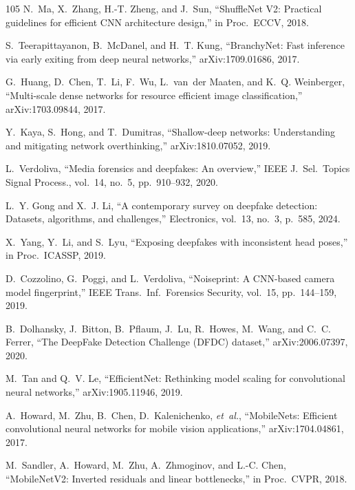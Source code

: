 \begin{thebibliography}{105}
N.~Ma, X.~Zhang, H.-T. Zheng, and J.~Sun, ``ShuffleNet V2: Practical guidelines for efficient CNN architecture design,'' in Proc.\ ECCV, 2018.

S.~Teerapittayanon, B.~McDanel, and H.~T. Kung, ``BranchyNet: Fast inference via early exiting from deep neural networks,'' arXiv:1709.01686, 2017.

G.~Huang, D.~Chen, T.~Li, F.~Wu, L.~van~der Maaten, and K.~Q. Weinberger, ``Multi-scale dense networks for resource efficient image classification,'' arXiv:1703.09844, 2017.

Y.~Kaya, S.~Hong, and T.~Dumitras, ``Shallow-deep networks: Understanding and mitigating network overthinking,'' arXiv:1810.07052, 2019.

L.~Verdoliva, ``Media forensics and deepfakes: An overview,'' IEEE J.\ Sel.\ Topics Signal Process., vol.~14, no.~5, pp.~910--932, 2020.

L.~Y. Gong and X.~J. Li, ``A contemporary survey on deepfake detection: Datasets, algorithms, and challenges,'' Electronics, vol.~13, no.~3, p.~585, 2024.

X.~Yang, Y.~Li, and S.~Lyu, ``Exposing deepfakes with inconsistent head poses,'' in Proc.\ ICASSP, 2019.

D.~Cozzolino, G.~Poggi, and L.~Verdoliva, ``Noiseprint: A CNN-based camera model fingerprint,'' IEEE Trans.\ Inf.\ Forensics Security, vol.~15, pp.~144--159, 2019.

B.~Dolhansky, J.~Bitton, B.~Pflaum, J.~Lu, R.~Howes, M.~Wang, and C.~C. Ferrer, ``The DeepFake Detection Challenge (DFDC) dataset,'' arXiv:2006.07397, 2020.

M.~Tan and Q.~V. Le, ``EfficientNet: Rethinking model scaling for convolutional neural networks,'' arXiv:1905.11946, 2019.

A.~Howard, M.~Zhu, B.~Chen, D.~Kalenichenko, \emph{et~al.}, ``MobileNets: Efficient convolutional neural networks for mobile vision applications,'' arXiv:1704.04861, 2017.

M.~Sandler, A.~Howard, M.~Zhu, A.~Zhmoginov, and L.-C. Chen, ``MobileNetV2: Inverted residuals and linear bottlenecks,'' in Proc.\ CVPR, 2018.


\end{thebibliography}
